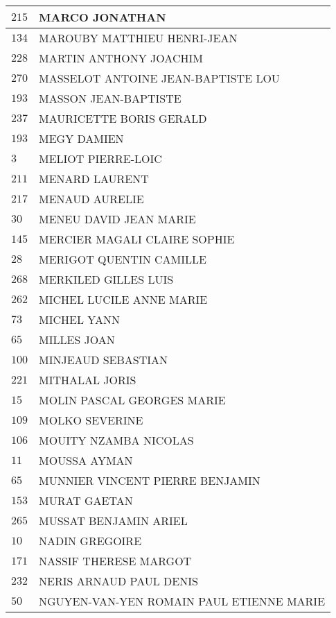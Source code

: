 \begin{xltabular}{\linewidth}{|l|X|}
    \hline
    $215$ & MARCO JONATHAN \\
    \hline
    $134$ & MAROUBY MATTHIEU HENRI-JEAN \\
    \hline
    $228$ & MARTIN ANTHONY JOACHIM \\
    \hline
    $270$ & MASSELOT ANTOINE JEAN-BAPTISTE LOU \\
    \hline
    $193$ & MASSON JEAN-BAPTISTE \\
    \hline
    $237$ & MAURICETTE BORIS GERALD \\
    \hline
    $193$ & MEGY DAMIEN \\
    \hline
    $3$ & MELIOT PIERRE-LOIC \\
    \hline
    $211$ & MENARD LAURENT \\
    \hline
    $217$ & MENAUD AURELIE \\
    \hline
    $30$ & MENEU DAVID JEAN MARIE \\
    \hline
    $145$ & MERCIER MAGALI CLAIRE SOPHIE \\
    \hline
    $28$ & MERIGOT QUENTIN CAMILLE \\
    \hline
    $268$ & MERKILED GILLES LUIS \\
    \hline
    $262$ & MICHEL LUCILE ANNE MARIE \\
    \hline
    $73$ & MICHEL YANN \\
    \hline
    $65$ & MILLES JOAN \\
    \hline
    $100$ & MINJEAUD SEBASTIAN \\
    \hline
    $221$ & MITHALAL JORIS \\
    \hline
    $15$ & MOLIN PASCAL GEORGES MARIE \\
    \hline
    $109$ & MOLKO SEVERINE \\
    \hline
    $106$ & MOUITY NZAMBA NICOLAS \\
    \hline
    $11$ & MOUSSA AYMAN \\
    \hline
    $65$ & MUNNIER VINCENT PIERRE BENJAMIN \\
    \hline
    $153$ & MURAT GAETAN \\
    \hline
    $265$ & MUSSAT BENJAMIN ARIEL \\
    \hline
    $10$ & NADIN GREGOIRE \\
    \hline
    $171$ & NASSIF THERESE MARGOT \\
    \hline
    $232$ & NERIS ARNAUD PAUL DENIS \\
    \hline
    $50$ & NGUYEN-VAN-YEN ROMAIN PAUL ETIENNE MARIE \\

\end{xltabular}
